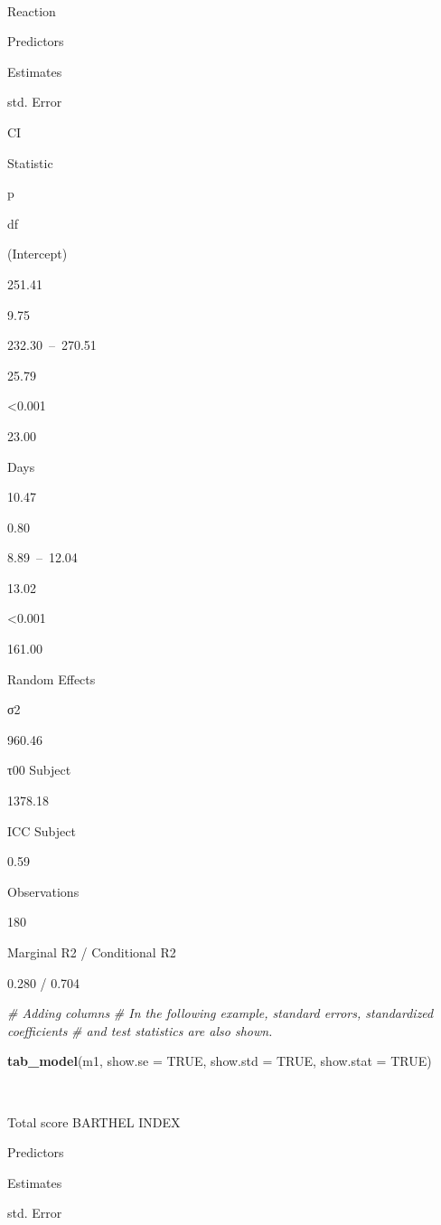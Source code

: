 \documentclass[]{article}
\newenvironment{Shaded}{\begin{snugshade}}{\end{snugshade}}
\newcommand{\KeywordTok}[1]{\textcolor[rgb]{0.13,0.29,0.53}{\textbf{#1}}}
\newcommand{\DataTypeTok}[1]{\textcolor[rgb]{0.13,0.29,0.53}{#1}}
\newcommand{\CommentTok}[1]{\textcolor[rgb]{0.56,0.35,0.01}{\textit{#1}}}
\newcommand{\OtherTok}[1]{\textcolor[rgb]{0.56,0.35,0.01}{#1}}
\newcommand{\NormalTok}[1]{#1}
\begin{document}
~

Reaction

Predictors

Estimates

std. Error

CI

Statistic

p

df

(Intercept)

251.41

9.75

232.30~--~270.51

25.79

\textless{}0.001

23.00

Days

10.47

0.80

8.89~--~12.04

13.02

\textless{}0.001

161.00

Random Effects

σ2

960.46

τ00 Subject

1378.18

ICC Subject

0.59

Observations

180

Marginal R2 / Conditional R2

0.280 / 0.704

\begin{Shaded}
\begin{Highlighting}[]
\CommentTok{# Adding columns}
\CommentTok{# In the following example, standard errors, standardized coefficients }
\CommentTok{# and test statistics are also shown.}

\KeywordTok{tab_model}\NormalTok{(m1, }\DataTypeTok{show.se =} \OtherTok{TRUE}\NormalTok{, }\DataTypeTok{show.std =} \OtherTok{TRUE}\NormalTok{, }\DataTypeTok{show.stat =} \OtherTok{TRUE}\NormalTok{)}
\end{Highlighting}
\end{Shaded}

~

Total score BARTHEL INDEX

Predictors

Estimates

std. Error
\end{document}

